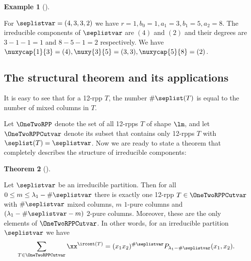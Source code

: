 \documentclass[numbers=enddot,12pt,final,onecolumn,notitlepage]{scrartcl}%
\theoremstyle{definition}
\newtheorem{theo}{Theorem}[section]
\newenvironment{theorem}[1][]
{\begin{theo}[#1]\begin{leftbar}}
{\end{leftbar}\end{theo}}
\newtheorem{exmp}[theo]{Example}
\newenvironment{example}[1][]
{\begin{exmp}[#1]\begin{leftbar}}
{\end{leftbar}\end{exmp}}
\let\sumnonlimits\sum
\renewcommand{\sum}{\sumnonlimits\limits}
\begin{document}
\begin{example}
 For $\seplistvar=(4,3,3,2)$ we have $r=1,b_0=1,a_1=3,b_1=5,a_2=8$. The irreducible components of $\seplistvar$ are $(4)$ and $(2)$ and their degrees are $3-1-1=1$ and $8-5-1=2$ respectively. We have $\nuxycap{1}{3}=(4),\nuxy{3}{5}=(3,3),\nuxycap{5}{8}=(2)$.
\end{example}


\subsection{The structural theorem and its applications}
It is easy to see that for a 12-rpp $T$, the number $\#\seplist(T)$ is equal to the number of mixed columns in $T$.

Let $\OneTwoRPP$ denote the set of all 12-rpps $T$ of shape $\lm$, and let $\OneTwoRPPCutvar$ denote its subset that contains only 12-rpps $T$ with $\seplist(T)=\seplistvar$. Now we are ready to state a theorem that completely describes the structure of irreducible components:
\begin{theorem}
\label{thm:12rpps}
 Let $\seplistvar$ be an irreducible partition. Then for all $0\leq m\leq \lambda_1-\#\seplistvar$ there is exactly one 12-rpp $T\in\OneTwoRPPCutvar$ with $\#\seplistvar$ mixed columns, $m$ $1$-pure columns and $(\lambda_1-\#\seplistvar-m)$ $2$-pure columns. Moreover, these are the only elements of $\OneTwoRPPCutvar$. In other words, for an irreducible partition $\seplistvar$ we have
  \begin{equation}
 \label{eq:thm12rpps}
 \sum_{T\in\OneTwoRPPCutvar} \xx^{\ircont(T)}=(x_1x_2)^{\#\seplistvar} P_{\lambda_1-\#\seplistvar}(x_1,x_2).
 \end{equation}
\end{theorem}
\end{document}
